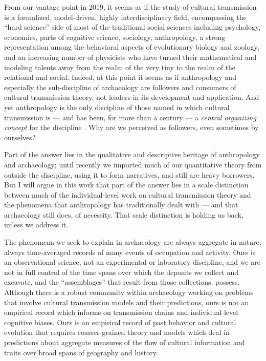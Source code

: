 
From our vantage point in 2019, it seems as if the study of cultural transmission is a  formalized, model-driven, highly interdisciplinary field, encompassing the “hard science” side of most of the traditional social sciences including psychology, economics, parts of cognitive science, sociology, anthropology, a strong representation among the behavioral aspects of evolutionary biology and zoology, and an increasing number of physicists who have turned their mathematical and modeling talents away from the realm of the very tiny to the realm of the relational and social.  Indeed, at this point it seems as if anthropology and especially the sub-discipline of archaeology are followers and consumers of cultural transmission theory, not leaders in its development and application.  And yet anthropology is the only discipline of those named in which cultural transmission is — and has been, for more than a century — a \emph{central organizing concept} for the discipline \citep{Lyman1998}.  Why are we perceived as followers, even sometimes by ourselves?  

Part of the answer lies in the qualitative and descriptive heritage of anthropology and archaeology; until recently we imported much of our quantitative theory from outside the discipline, using it to form narratives, and still are heavy borrowers.  But I will argue in this work that part of the answer lies in a scale distinction between much of the individual-level work on cultural transmission theory and the phenomena that anthropology has traditionally dealt with — and that archaeology still does, of necessity.  That scale distinction is holding us back, unless we address it.

The phenomena we seek to explain in archaeology are always aggregate in nature, always time-averaged records of many events of occupation and activity.  Ours is an observational science, not an experimental or laboratory discipline, and we are not in full control of the time spans over which the deposits we collect and excavate, and the “assemblages” that result from those collections, possess.  Although there is a robust community within archaeology working on problems that involve cultural transmission models and their predictions, ours is not an empirical record which informs on transmission chains and individual-level cognitive biases.  Ours is an empirical record of past behavior and cultural evolution that requires coarser-grained theory and models which deal in predictions about aggregate measures of the flow of cultural information and traits over broad spans of geography and history.

